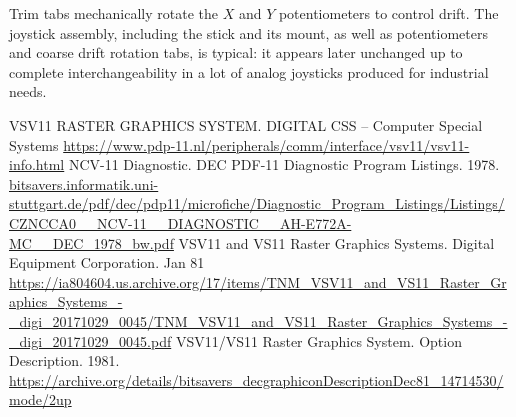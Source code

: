 \documentclass[11pt, a4paper]{article}
\begin{document}
Trim tabs mechanically rotate the $X$ and $Y$ potentiometers to control drift. The joystick assembly, including the stick and its mount, as well as potentiometers and coarse drift rotation tabs, is typical: it appears later unchanged up to complete interchangeability in a lot of analog joysticks produced for industrial needs.

\begin{thebibliography}{9}
 VSV11 RASTER GRAPHICS SYSTEM. D\textbar I\textbar G\textbar I\textbar T\textbar A\textbar L CSS -- Computer Special Systems \url{https://www.pdp-11.nl/peripherals/comm/interface/vsv11/vsv11-info.html}
 NCV-11 Diagnostic. DEC PDF-11 Diagnostic Program Listings. 1978. \url{bitsavers.informatik.uni-stuttgart.de/pdf/dec/pdp11/microfiche/Diagnostic_Program_Listings/Listings/CZNCCA0__NCV-11__DIAGNOSTIC__AH-E772A-MC__DEC_1978_bw.pdf}
 VSV11 and VS11 Raster Graphics Systems. Digital Equipment Corporation. Jan 81 \url{https://ia804604.us.archive.org/17/items/TNM_VSV11_and_VS11_Raster_Graphics_Systems_-_digi_20171029_0045/TNM_VSV11_and_VS11_Raster_Graphics_Systems_-_digi_20171029_0045.pdf}
 VSV11/VS11 Raster Graphics System. Option Description. 1981. \url{https://archive.org/details/bitsavers_decgraphiconDescriptionDec81_14714530/mode/2up}
\end{thebibliography}
\end{document}
